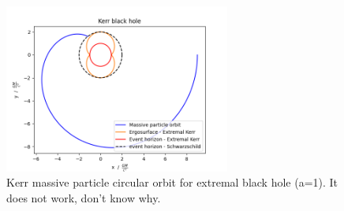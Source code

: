 \documentclass{article}
\begin{document}
\begin{figure}
    \centering
    \includegraphics[width=0.66\textwidth]{images/Kerr_orbits.png}
    \caption{Kerr massive particle circular orbit for extremal black hole (a=1). It does not work, don't know why.}
    \label{fig:Kerr massive particle orbit}
\end{figure}
\end{document}
